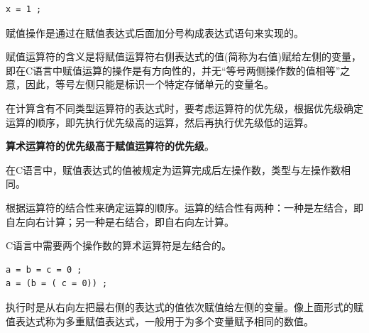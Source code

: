 \documentclass{article}
\begin{document}
\begin{lstlisting}
x = 1 ;
\end{lstlisting}

赋值操作是通过在赋值表达式后面加分号构成表达式语句来实现的。

赋值运算符的含义是将赋值运算符右侧表达式的值(简称为右值)赋给左侧的变量，即在C语言中赋值运算的操作是有方向性的，并无“等号两侧操作数的值相等”之意，因此，等号左侧只能是标识一个特定存储单元的变量名。

在计算含有不同类型运算符的表达式时，要考虑运算符的优先级，根据优先级确定运算的顺序，即先执行优先级高的运算，然后再执行优先级低的运算。

\textbf{算术运算符的优先级高于赋值运算符的优先级}。

在C语言中，赋值表达式的值被规定为运算完成后左操作数，类型与左操作数相同。

根据运算符的结合性来确定运算的顺序。运算的结合性有两种：一种是左结合，即自左向右计算；另一种是右结合，即自右向左计算。

C语言中需要两个操作数的算术运算符是左结合的。

\begin{lstlisting}
a = b = c = 0 ;
a = (b = ( c = 0)) ;
\end{lstlisting}

执行时是从右向左把最右侧的表达式的值依次赋值给左侧的变量。像上面形式的赋值表达式称为多重赋值表达式，一般用于为多个变量赋予相同的数值。
\end{document}
